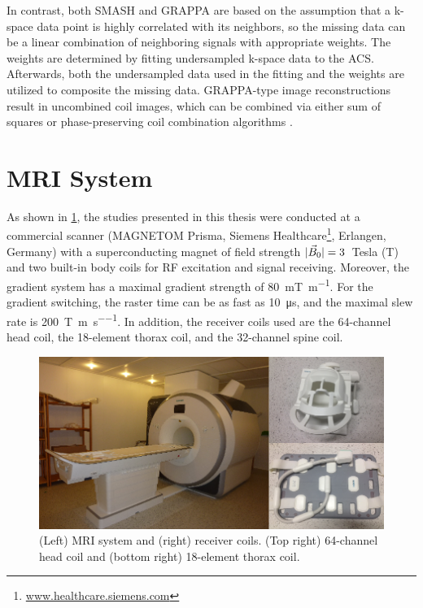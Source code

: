 In contrast, both SMASH and GRAPPA are based on the assumption that a k-space data point is highly correlated with its neighbors, so the missing data can be a linear combination of neighboring signals with appropriate weights. The weights are determined by fitting undersampled k-space data to the ACS. Afterwards, both the undersampled data used in the fitting and the weights are utilized to composite the missing data. GRAPPA-type image reconstructions result in uncombined coil images, which can be combined via either sum of squares \cite{1990_phased_array} or phase-preserving coil combination algorithms \cite{2000_coil_comb}.


\section{MRI System}
As shown in \cref{Fig:mri-sys}, the studies presented in this thesis were conducted at a commercial scanner (MAGNETOM Prisma, Siemens Healthcare\footnote{\url{www.healthcare.siemens.com}}, Erlangen, Germany) with a superconducting magnet of field strength $\lvert\vec{B}_0\rvert = \num{3}$~Tesla (\si{\tesla}) and two built-in body coils for RF excitation and signal receiving. Moreover, the gradient system has a maximal gradient strength of \SI{80}{\milli\tesla\per\meter}. For the gradient switching, the raster time can be as fast as \SI{10}{\micro\second}, and the maximal slew rate is \SI{200}{\tesla\per\meter\per\second}. In addition, the receiver coils used are the \num{64}-channel head coil, the \num{18}-element thorax coil, and the \num{32}-channel spine coil.
\begin{figure}[tb]
  \centering
  \includegraphics[width = 1.0\textwidth]{fig/mri-sys.png}
  \caption{(Left) MRI system and (right) receiver coils. (Top right) 64-channel head coil and (bottom right) 18-element thorax coil.} \label{Fig:mri-sys}
\end{figure}


